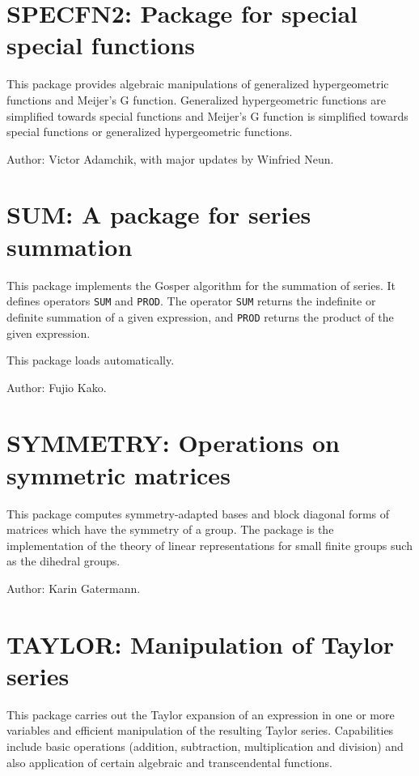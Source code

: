 \section{SPECFN2: Package for special special functions} 


This package provides algebraic manipulations of generalized
hypergeometric functions and Meijer's G function.  Generalized
hypergeometric functions are simplified towards special functions and
Meijer's G function is simplified towards special functions or generalized
hypergeometric functions.

Author: Victor Adamchik, with major updates by Winfried Neun.

\section{SUM: A package for series summation} 
\hypertarget{operator:SUM}{}
\hypertarget{operator:PROD}{}

This package implements the Gosper algorithm for the summation of series.
It defines operators {\tt SUM} and {\tt PROD}.  The operator {\tt SUM}
returns the indefinite or definite summation of a given expression, and
{\tt PROD} returns the product of the given expression.

This package loads automatically.

Author: Fujio Kako.

\section{SYMMETRY: Operations on symmetric matrices} 

This package computes symmetry-adapted bases and block diagonal forms of
matrices which have the symmetry of a group.  The package is the
implementation of the theory of linear representations for small finite
groups such as the dihedral groups.

Author: Karin Gatermann.

\section{TAYLOR: Manipulation of Taylor series}
 
 

This package carries out the Taylor expansion of an expression in one or
more variables and efficient manipulation of the resulting Taylor series.
Capabilities include basic operations (addition, subtraction,
multiplication and division) and also application of certain algebraic and
transcendental functions.

